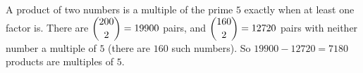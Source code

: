 A product of two numbers is a multiple of the prime $5$ exactly when at least one factor is. There are $\dbinom{200}{2}=19900$ pairs, and $\dbinom{160}{2}=12720$ pairs with neither number a multiple of $5$ (there are $160$ such numbers). So $19900-12720=\boxed{7180}$ products are multiples of $5$.
